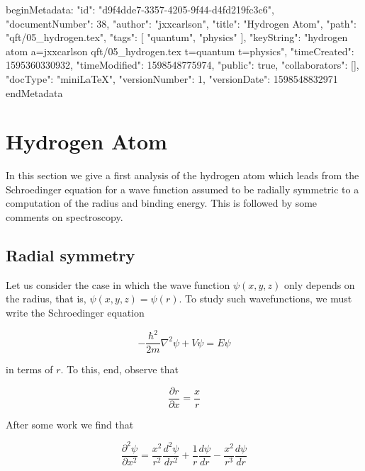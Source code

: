 beginMetadata:
{
    "id": "d9f4dde7-3357-4205-9f44-d4fd219fc3c6",
    "documentNumber": 38,
    "author": "jxxcarlson",
    "title": "Hydrogen Atom",
    "path": "qft/05_hydrogen.tex",
    "tags": [
        "quantum",
        "physics"
    ],
    "keyString": "hydrogen atom a=jxxcarlson qft/05_hydrogen.tex t=quantum t=physics",
    "timeCreated": 1595360330932,
    "timeModified": 1598548775974,
    "public": true,
    "collaborators": [],
    "docType": "miniLaTeX",
    "versionNumber": 1,
    "versionDate": 1598548832971
}
endMetadata

\setcounter{section}{5}

\section{Hydrogen Atom}

\innertableofcontents

In this section we give a first analysis of the hydrogen atom which leads from the Schroedinger equation for a wave function assumed to be radially symmetric to a computation of the radius and binding energy.  This is followed by some comments on spectroscopy. 

\subsection{Radial symmetry}



Let us consider the case in which the wave function $\psi(x,y,z)$ only depends on the radius, that is, 
$\psi(x,y,z) = \psi(r)$.  To study such wavefunctions,
we must write the Schroedinger equation

\begin{equation}
-\frac{\hbar^2 }{2m} \nabla^2 \psi  + V\psi = E\psi
\end{equation}

in terms of $r$.  To this, end, observe that

\begin{equation}
\frac{\partial r}{\partial x} = \frac{x}{r}
\end{equation}

After some work we find that

\begin{equation}
\frac{\partial^2\psi}{ \partial x^2} 
 = \frac{ x^2 }{ r^2 }\frac{ d^2\psi }{ dr^2 }
   + \frac{1}{r}\frac{d\psi}{dr} - \frac{ x^2 }{ r^3 }\frac{d\psi}{dr}
\end{equation}

